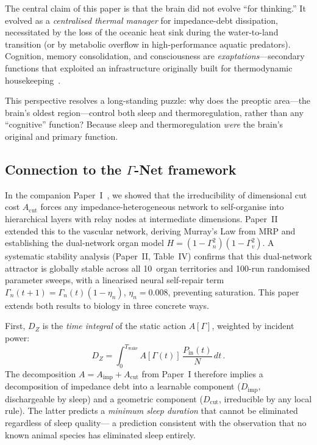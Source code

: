 ﻿\documentclass[aps,pre,twocolumn,superscriptaddress,floatfix]{revtex4-2}
\begin{document}
The central claim of this paper is that the brain
did not evolve ``for thinking.''
It evolved as a \emph{centralised thermal manager}
for impedance-debt dissipation,
necessitated by the loss of the oceanic heat sink
during the water-to-land transition
(or by metabolic overflow in high-performance
aquatic predators).
Cognition, memory consolidation, and consciousness
are \emph{exaptations}---secondary functions that
exploited an infrastructure originally built for
thermodynamic housekeeping~\cite{Torday2016}.

This perspective resolves a long-standing puzzle:
why does the preoptic area---the brain's oldest
region---control both sleep and thermoregulation,
rather than any ``cognitive'' function?
Because sleep and thermoregulation \emph{were}
the brain's original and primary function.

\subsection{Connection to the $\Gamma$-Net framework}

In the companion Paper~I~\cite{PaperI}, we showed
that the irreducibility of dimensional cut cost
$A_{\mathrm{cut}}$ forces any impedance-heterogeneous
network to self-organise into hierarchical layers
with relay nodes at intermediate dimensions.
Paper~II~\cite{PaperII} extended this to the vascular
network, deriving Murray's Law from MRP and establishing
the dual-network organ model $H = (1-\Gamma_n^2)(1-\Gamma_v^2)$.
A systematic stability analysis (Paper~II, Table~IV) confirms
that this dual-network attractor is globally stable across all
10~organ territories and 100-run randomised parameter sweeps,
with a linearised neural self-repair term
$\Gamma_n(t+1) = \Gamma_n(t)(1-\eta_n)$, $\eta_n = 0.008$,
preventing saturation.
This paper extends both results to biology in three concrete ways.

First, $D_Z$ is the \emph{time integral} of the static
action $A[\Gamma]$, weighted by incident power:
\begin{equation}
  D_Z = \int_0^{T_{\mathrm{wake}}}
    A[\Gamma(t)]\,\frac{P_{\mathrm{in}}(t)}{N}\,dt\,.
  \label{eq:DZ-from-A}
\end{equation}
The decomposition $A = A_{\mathrm{imp}} + A_{\mathrm{cut}}$
from Paper~I therefore implies a decomposition of
impedance debt into a learnable component
($D_{\mathrm{imp}}$, dischargeable by sleep)
and a geometric component
($D_{\mathrm{cut}}$, irreducible by any local rule).
The latter predicts a \emph{minimum sleep duration}
that cannot be eliminated regardless of sleep quality---
a prediction consistent with the observation that no
known animal species has eliminated sleep entirely.
\end{document}
